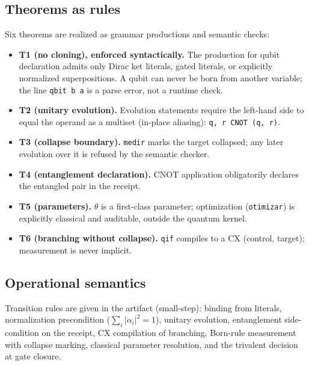 \documentclass[11pt]{article}
\begin{document}
\subsection{Theorems as rules}
Six theorems are realized as grammar productions and semantic checks:
\begin{itemize}
\item \textbf{T1 (no cloning), enforced syntactically.} The production for qubit declaration admits only Dirac ket literals, gated literals, or explicitly normalized superpositions. A qubit can never be born from another variable; the line \texttt{qbit b \textleftarrow a} is a parse error, not a runtime check.
\item \textbf{T2 (unitary evolution).} Evolution statements require the left-hand side to equal the operand as a multiset (in-place aliasing): \texttt{q, r \textleftarrow CNOT \mytimes (q, r)}.
\item \textbf{T3 (collapse boundary).} \texttt{medir} marks the target collapsed; any later evolution over it is refused by the semantic checker.
\item \textbf{T4 (entanglement declaration).} CNOT application obligatorily declares the entangled pair in the receipt.
\item \textbf{T5 (parameters).} $\theta$ is a first-class parameter; optimization (\texttt{otimizar}) is explicitly classical and auditable, outside the quantum kernel.
\item \textbf{T6 (branching without collapse).} \texttt{qif} compiles to a CX (control, target); measurement is never implicit.
\end{itemize}

\subsection{Operational semantics}
Transition rules are given in the artifact (small-step): binding from literals, normalization precondition ($\sum_i |\alpha_i|^2 = 1$), unitary evolution, entanglement side-condition on the receipt, CX compilation of branching, Born-rule measurement with collapse marking, classical parameter resolution, and the trivalent decision at gate closure.
\end{document}
